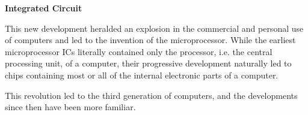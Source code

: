 \documentclass[12pt, ]{article}
\begin{document}
\vspace*{2em}
\noindent \textbf{Integrated Circuit}

This new development heralded an explosion in the commercial and personal use of computers and led to the invention of the microprocessor. While the earliest microprocessor ICs literally contained only the processor, i.e. the central processing unit, of a computer, their progressive development naturally led to chips containing most or all of the internal electronic parts of a computer.

This revolution led to the third generation of computers, and the developments since then have been more familiar. 

%
%
%
\end{document}
